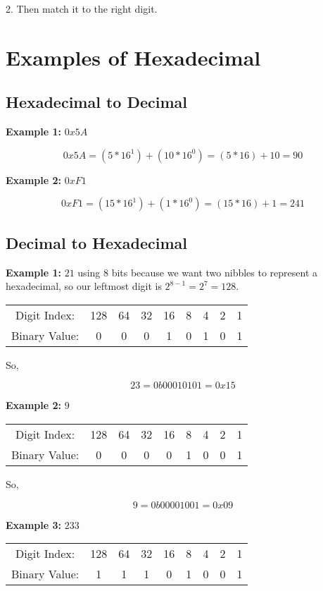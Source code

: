 \documentclass{article}
\begin{document}
2. Then match it to the right digit. 

\section{Examples of Hexadecimal}
\subsection*{Hexadecimal to Decimal}
\textbf{Example 1:} $0x5A$

\[
0x5A = (5 * 16^1) + (10 * 16^0) = (5 * 16) + 10 = 90
\] 

\noindent \textbf{Example 2:} $0xF1$ 

\[
0xF1 = (15 * 16^1) + (1 * 16^0) = (15 * 16) + 1 = 241
\] 

\subsection*{Decimal to Hexadecimal}
\textbf{Example 1:} $21$ using 8 bits because we want two nibbles to represent a hexadecimal, so our leftmost
digit is $2^{8-1} = 2^7 = 128$.

\begin{center}
\begin{tabular}{c c c c c c c c c}
Digit Index: & 128 & 64 & 32 & 16 & 8 & 4 & 2 & 1 \\
Binary Value: & 0 & 0 & 0 & 1 & 0 & 1 & 0 & 1 \\
\end{tabular}
\end{center} 

So,

\[
23 = 0b0001 0101 = 0x15
\]

\noindent \textbf{Example 2:} $9$ 

\begin{center}
\begin{tabular}{c c c c c c c c c}
Digit Index: & 128 & 64 & 32 & 16 & 8 & 4 & 2 & 1 \\
Binary Value: & 0 & 0 & 0 & 0 & 1 & 0 & 0 & 1 \\
\end{tabular}
\end{center} 

So, 

\[
9 = 0b0000 1001 = 0x09
\]

\noindent \textbf{Example 3:} $233$

\begin{center}
\begin{tabular}{c c c c c c c c c}
Digit Index: & 128 & 64 & 32 & 16 & 8 & 4 & 2 & 1 \\
Binary Value: & 1 & 1 & 1 & 0 & 1 & 0 & 0 & 1 \\
\end{tabular}
\end{center} 
\end{document}
